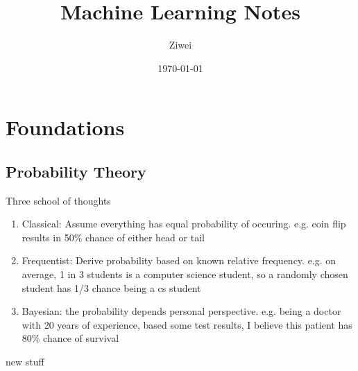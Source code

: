 \documentclass[11pt]{article}
\author{Ziwei}
\date{\today}
\title{Machine Learning Notes}
\begin{document}
\maketitle
\tableofcontents


\section{Foundations}
\label{sec:org7d58c6f}
\subsection{Probability Theory}
\label{sec:orgddde38b}
Three school of thoughts 
\begin{enumerate}
\item Classical: Assume everything has equal probability of occuring. e.g. coin flip results in 50\% chance of either head or tail
\item Frequentist: Derive probability based on known relative frequency. e.g. on average, 1 in 3 students is a computer science student, so a randomly chosen student has 1/3 chance being a cs student
\item Bayesian: the probability depends personal perspective. e.g. being a doctor with 20 years of experience, based some test results, I believe this patient has 80\% chance of survival
\end{enumerate}
new stuff
\end{document}

